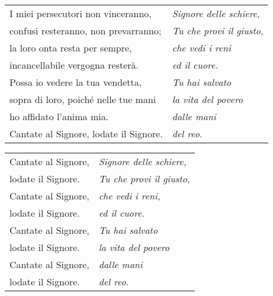 \spazio

\begin{tabular}{@{} p{6.25cm} p{4.25cm}}
  I miei persecutori non vinceranno, & \emph{Signore delle schiere,} \\
  confusi resteranno, non prevarranno; & \emph{Tu che provi il giusto,} \\
  la loro onta resta per sempre, & \emph{che vedi i reni} \\
  incancellabile vergogna resterà. & \emph{ed il cuore.} \\
  Possa io vedere la tua vendetta, & \emph{Tu hai salvato} \\
  sopra di loro, poiché nelle tue mani & \emph{la vita del povero} \\
  ho affidato l'anima mia. & \emph{dalle mani} \\
  Cantate al Signore, lodate il Signore. & \emph{del reo.}
\end{tabular}

\spazio

\begin{tabular}{@{} p{6.25cm} p{4.25cm}}
  Cantate al Signore, & \emph{Signore delle schiere,} \\
  lodate il Signore. & \emph{Tu che provi il giusto,} \\
  Cantate al Signore, & \emph{che vedi i reni,} \\
  lodate il Signore. & \emph{ed il cuore.} \\
  Cantate al Signore, & \emph{Tu hai salvato} \\
  lodate il Signore. & \emph{la vita del povero} \\
  Cantate al Signore, & \emph{dalle mani} \\
  lodate il Signore. & \emph{del reo.} \\
\end{tabular}